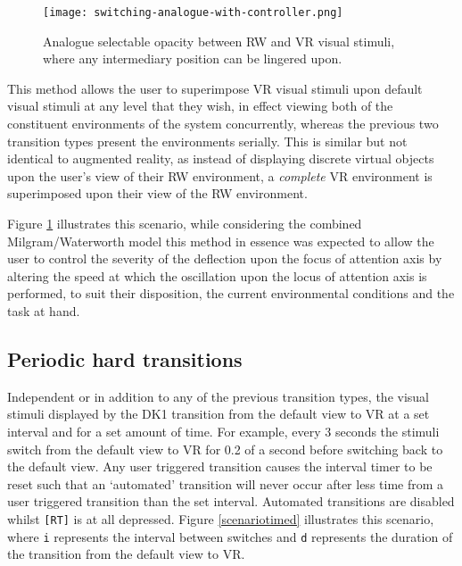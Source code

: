 \begin{figure}[h]
	\begin{center}
		\texttt{[image: switching-analogue-with-controller.png]}
		\caption{Analogue selectable opacity between RW and VR visual stimuli, where any intermediary position can be lingered upon.}
		\label{scenario2}
	\end{center}
\end{figure}

This method allows the user to superimpose VR visual stimuli upon default visual stimuli at any level that they wish, in effect viewing both of the constituent environments of the system concurrently, whereas the previous two transition types present the environments serially. This is similar but not identical to augmented reality, as instead of displaying discrete virtual objects upon the user's view of their RW environment, a \textit{complete} VR environment is superimposed upon their view of the RW environment.

Figure \ref{scenario2} illustrates this scenario, while considering the combined Milgram/Waterworth model this method in essence was expected to allow the user to control the severity of the deflection upon the focus of attention axis by altering the speed at which the oscillation upon the locus of attention axis is performed, to suit their disposition, the current environmental conditions and the task at hand.


\subsection{Periodic hard transitions}
\label{subsub-periodic}
Independent or in addition to any of the previous transition types, the visual stimuli displayed by the DK1 transition from the default view to VR at a set interval and for a set amount of time. For example, every 3 seconds the stimuli switch from the default view to VR for 0.2 of a second before switching back to the default view. Any user triggered transition causes the interval timer to be reset such that an `automated' transition will never occur after less time from a user triggered transition than the set interval. Automated transitions are disabled whilst \texttt{[RT]} is at all depressed. Figure \ref{scenariotimed} illustrates this scenario, where \texttt{i} represents the interval between switches and \texttt{d} represents the duration of the transition from the default view to VR.

